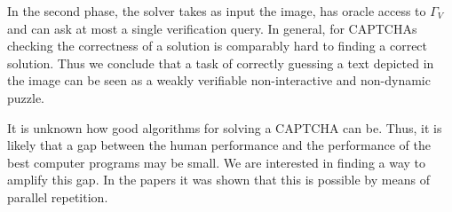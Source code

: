 In the second phase, the solver takes as input the image, has oracle access to $\Gamma_V$
and can ask at most a single verification query. In general, for CAPTCHAs checking the correctness of a solution is
comparably hard to finding a correct solution.
Thus we conclude that a task of correctly guessing a text depicted in the image can be seen as a weakly verifiable non-interactive and non-dynamic puzzle.

It is unknown how good algorithms for solving a CAPTCHA can be. Thus, it is likely that a gap between the human
performance and the performance of the best computer programs may be small. We are interested in finding a way to amplify this gap.
In the papers \cite{holenstein2011general, dodis2009security} it was shown that this is possible by means of parallel repetition.



